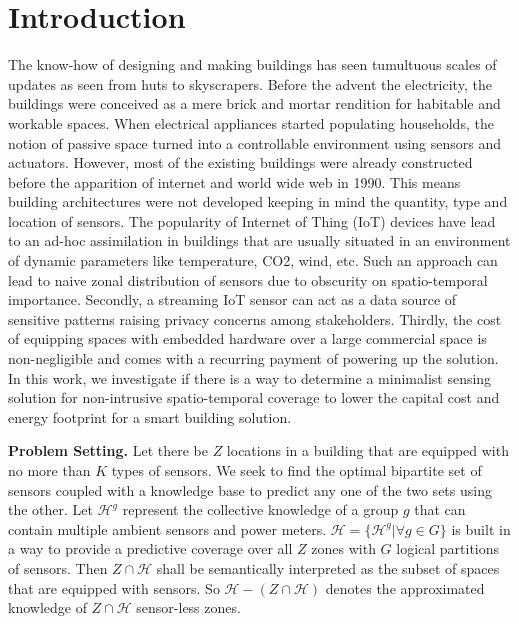 \section{Introduction}
\label{chap:intro}

The know-how of designing and making buildings has seen tumultuous scales of updates as seen from huts to skyscrapers. 
 Before the advent the electricity, the buildings were conceived as a mere brick and mortar rendition for habitable and workable spaces. 
 When electrical appliances started populating households, the notion of passive space turned into a controllable environment using sensors and actuators.
However, most of the existing buildings were already constructed before the apparition of internet and world wide web in 1990.
This means building architectures were not developed keeping in mind the quantity, type and location of sensors.
The popularity of Internet of Thing (IoT) devices have lead to an ad-hoc assimilation in buildings that are usually situated in an environment of dynamic parameters like temperature, CO2, wind, etc.
Such an approach can lead to naive zonal distribution of sensors due to obscurity on spatio-temporal importance. 
Secondly, a streaming IoT sensor can act as a data source of sensitive patterns raising privacy concerns among stakeholders.
Thirdly, the cost of equipping spaces with embedded hardware over a large commercial space is non-negligible and comes with a recurring payment of powering up the solution.
In this work, we investigate if there is a way to determine a minimalist sensing solution for non-intrusive spatio-temporal coverage to lower the capital cost and energy footprint for a smart building solution. 


\noindent \textbf{Problem Setting.}
Let there be $Z$ locations in a building that are equipped with no more than $K$ types of sensors. 
We seek to find the optimal bipartite set of sensors coupled with a knowledge base to predict any one of the two sets using the other.
Let $\mathcal{H}^g$ represent the collective knowledge of a group $g$ that can contain multiple ambient sensors and power meters.
$\mathcal{H} = \{\mathcal{H}^g | \forall g \in G \}$ is built in a way to provide a predictive coverage over all $Z$ zones with $G$ logical partitions of sensors.
Then $Z \cap \mathcal{H}$ shall be semantically interpreted as the subset of spaces that are equipped with sensors.
So $\mathcal{H} - (Z \cap \mathcal{H})$ denotes the approximated knowledge of $Z \cap \mathcal{H}$ sensor-less zones.\\

